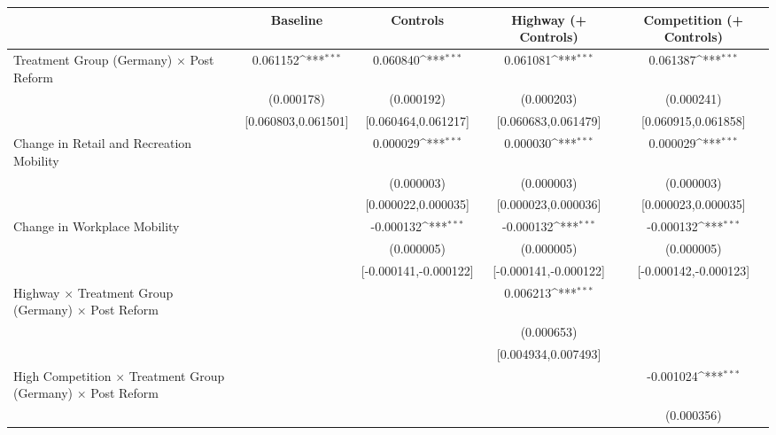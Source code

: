 {
\def\sym#1{\ifmmode^{#1}\else\(^{#1}\)\fi}
\begin{tabular}{l*{4}{c}}
\toprule
                    &\multicolumn{1}{c}{Baseline}&\multicolumn{1}{c}{Controls}&\multicolumn{1}{c}{Highway (+ Controls)}&\multicolumn{1}{c}{Competition (+ Controls)}\\
\midrule
Treatment Group (Germany) $\times$ Post Reform&    0.061152\sym{***}&    0.060840\sym{***}&    0.061081\sym{***}&    0.061387\sym{***}\\
                    &  (0.000178)         &  (0.000192)         &  (0.000203)         &  (0.000241)         \\
                    &[0.060803,0.061501]         &[0.060464,0.061217]         &[0.060683,0.061479]         &[0.060915,0.061858]         \\
Change in Retail and Recreation Mobility&                     &    0.000029\sym{***}&    0.000030\sym{***}&    0.000029\sym{***}\\
                    &                     &  (0.000003)         &  (0.000003)         &  (0.000003)         \\
                    &                     &[0.000022,0.000035]         &[0.000023,0.000036]         &[0.000023,0.000035]         \\
Change in Workplace Mobility&                     &   -0.000132\sym{***}&   -0.000132\sym{***}&   -0.000132\sym{***}\\
                    &                     &  (0.000005)         &  (0.000005)         &  (0.000005)         \\
                    &                     &[-0.000141,-0.000122]         &[-0.000141,-0.000122]         &[-0.000142,-0.000123]         \\
Highway $\times$ Treatment Group (Germany) $\times$ Post Reform&                     &                     &    0.006213\sym{***}&                     \\
                    &                     &                     &  (0.000653)         &                     \\
                    &                     &                     &[0.004934,0.007493]         &                     \\
High Competition $\times$ Treatment Group (Germany) $\times$ Post Reform&                     &                     &                     &   -0.001024\sym{***}\\
                    &                     &                     &                     &  (0.000356)         \\

\end{tabular}}

